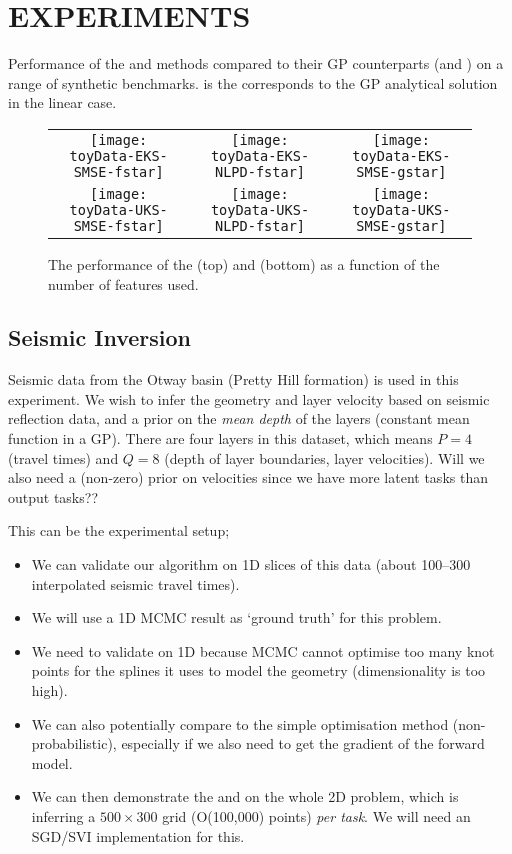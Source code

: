 \section{EXPERIMENTS}
\begin{table*}
\caption{Performance of the \eks and \uks methods compared to their GP counterparts (\egp and \ugp) on a range of synthetic benchmarks. 
\gp is the corresponds to the GP analytical solution in the linear case.
}
\begin{center}

\end{center}
\end{table*}
%
\begin{figure*}
\centering
\begin{tabular}{c c c}
\texttt{[image: toyData-EKS-SMSE-fstar]} &
\texttt{[image: toyData-EKS-NLPD-fstar]} &
\texttt{[image: toyData-EKS-SMSE-gstar]} \\
\texttt{[image: toyData-UKS-SMSE-fstar]} &
\texttt{[image: toyData-UKS-NLPD-fstar]} &
\texttt{[image: toyData-UKS-SMSE-gstar]} \\
\end{tabular}
\caption{The performance of the \eks (top) and \uks (bottom) as a function of the number of features used. }
\end{figure*}

\subsection{Seismic Inversion}

Seismic data from the Otway basin (Pretty Hill formation) is used in this
experiment. We wish to infer the geometry and layer velocity based on seismic
reflection data, and a prior on the \emph{mean depth} of the layers (constant
mean function in a GP). There are four layers in this dataset, which means $P =
4$ (travel times) and $Q = 8$ (depth of layer boundaries, layer velocities).
Will we also need a (non-zero) prior on velocities since we have more latent
tasks than output tasks??

This can be the experimental setup;
\begin{itemize}
    \item We can validate our algorithm on 1D slices of this data (about
        100--300 interpolated seismic travel times).
    \item We will use a 1D MCMC result as `ground truth' for this problem.
    \item We need to validate on 1D because MCMC cannot optimise too many knot
        points for the splines it uses to model the geometry (dimensionality is
        too high).
    \item We can also potentially compare to the simple optimisation method
        (non-probabilistic), especially if we also need to get the gradient of
        the forward model.
    \item We can then demonstrate the \eks and \uks on the whole 2D problem,
        which is inferring a $500\times300$ grid (O(100,000) points) \emph{per
            task}. We will need an SGD/SVI implementation for this.
\end{itemize}
